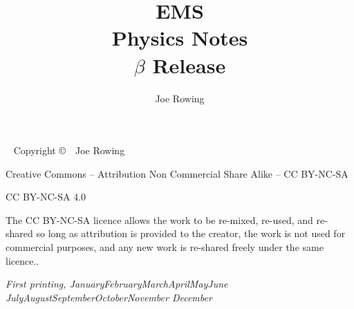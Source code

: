 \documentclass[symmetric,a4paper]{tufte-book}
\title{EMS \\Physics Notes \\ $\beta$ Release}
\author[Joe Rowing]{Joe Rowing}
\newcommand{\monthyear}{%
  \ifcase\month\or January\or February\or March\or April\or May\or June\or
  July\or August\or September\or October\or November\or
  December\fi\space\number\year
}
\newcommand{\blankpage}{\newpage\hbox{}\thispagestyle{empty}\newpage}
\begin{document}



\maketitle


\newpage
\begin{fullwidth}
~\vfill
\thispagestyle{empty}
\setlength{\parindent}{0pt}
\setlength{\parskip}{\baselineskip}
Copyright \copyright\ \the\year\ Joe Rowing

\par{}

\par{}

\par Creative Commons – Attribution Non Commercial Share Alike – CC BY-NC-SA

CC BY-NC-SA 4.0

The CC BY-NC-SA licence allows the work to be re-mixed, re-used, and re-shared so long as  attribution is provided to the creator, the work is not used for commercial purposes, and any new work is re-shared freely under the same licence..

\par\textit{First printing, \monthyear}
\end{fullwidth}

\tableofcontents











%













 
 

 
 
 
 
 

%
\setcounter{tocdepth}{10}
\printindex
\end{document}
